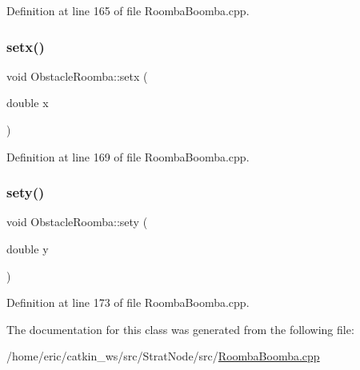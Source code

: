 Definition at line 165 of file Roomba\+Boomba.\+cpp.

\mbox{\label{classObstacleRoomba_a3596a1ec48e9dafe5138e2187b819a1e}} 
\subsubsection{\texorpdfstring{setx()}{setx()}}
{\footnotesize\ttfamily void Obstacle\+Roomba\+::setx (\begin{DoxyParamCaption}\item[{double}]{x }\end{DoxyParamCaption})\hspace{0.3cm}{\ttfamily [inline]}}



Definition at line 169 of file Roomba\+Boomba.\+cpp.

\mbox{\label{classObstacleRoomba_a90dbf8bf101c7d6a9f6b227b1cfc39be}} 
\subsubsection{\texorpdfstring{sety()}{sety()}}
{\footnotesize\ttfamily void Obstacle\+Roomba\+::sety (\begin{DoxyParamCaption}\item[{double}]{y }\end{DoxyParamCaption})\hspace{0.3cm}{\ttfamily [inline]}}



Definition at line 173 of file Roomba\+Boomba.\+cpp.



The documentation for this class was generated from the following file\+:\begin{DoxyCompactItemize}
\item 
/home/eric/catkin\+\_\+ws/src/\+Strat\+Node/src/\mbox{\hyperlink{RoombaBoomba_8cpp}{Roomba\+Boomba.\+cpp}}\end{DoxyCompactItemize}
